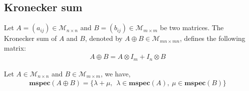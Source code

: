 

\subsection{Kronecker sum}
\begin{definition}
Let $A=(a_{ij}) \in \mathcal{M}_{n \times n}$ and $B=(b_{ij}) \in \mathcal{M}_{m \times m}$ be two matrices. The Kronecker sum of $A$ and $B$, denoted by $A \oplus B  \in \mathcal{M}_{mn \times mn}$, defines the following matrix:
\begin{align}
A \oplus B = A \otimes I_m + I_n \otimes B
\end{align}
\end{definition}

\begin{proposition}
Let $A \in \mathcal{M}_{n \times n}$ and $B \in \mathcal{M}_{m \times m}$, we have,
\begin{align}
\label{kronecker_sum_spec}
\mathbf{mspec} ( A \oplus B ) = \{ \lambda +  \mu,~~\lambda \in \mathbf{mspec}(A),~\mu \in \mathbf{mspec}(B) \}
\end{align}
\end{proposition}

